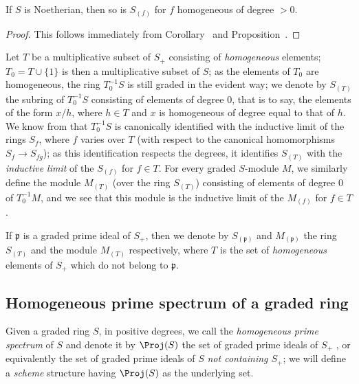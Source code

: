 \begin{corollary}[2.2.6]
\label{II.2.2.6}
If $S$ is Noetherian, then so is $S_{(f)}$ for $f$ homogeneous of degree $>0$.
\end{corollary}

\begin{proof}
This follows immediately from Corollary~ and Proposition~.
\end{proof}

\begin{env}[2.2.7]
\label{II.2.2.7}
Let $T$ be a multiplicative subset of $S_+$ consisting of \emph{homogeneous} elements;
$T_0=T\cup\{1\}$ is then a multiplicative subset of $S$;
as the elements of $T_0$ are homogeneous, the ring $T_0^{-1}S$ is still graded in the evident way;
we denote by $S_{(T)}$ the subring of $T_0^{-1}S$ consisting of elements of degree $0$, that is to say, the elements of the form $x/h$, where $h\in T$ and $x$ is homogeneous of degree equal to that of $h$.
We know from  that $T_0^{-1}S$ is canonically identified with the inductive limit of the rings $S_f$, where $f$ varies over $T$ (with respect to the canonical homomorphisms $S_f\to S_{fg}$);
as this identification respects the degrees, it identifies $S_{(T)}$ with the \emph{inductive limit} of the $S_{(f)}$ for $f\in T$.
For every graded $S$-module $M$, we similarly define the module $M_{(T)}$ (over the ring $S_{(T)}$) consisting of elements of degree $0$ of $T_0^{-1}M$, and we see that this module is the inductive limit of the $M_{(f)}$ for $f\in T$.

If $\mathfrak{p}$ is a graded prime ideal of $S_+$, then we denote by $S_{(\mathfrak{p})}$ and $M_{(\mathfrak{p})}$ the ring $S_{(T)}$ and the module $M_{(T)}$ respectively, where $T$ is the set of \emph{homogeneous} elements of $S_+$ which do not belong to $\mathfrak{p}$.\end{env}


\subsection{Homogeneous prime spectrum of a graded ring}
\label{subsection:II.2.3}

\begin{env}[2.3.1]
\label{II.2.3.1}
Given a graded ring $S$, in positive degrees, we call the \emph{homogeneous prime spectrum} of $S$ and denote it by $\Proj(S)$ the set of graded prime ideals of $S_+$ , or equivalently the set of graded prime ideals of $S$ \emph{not containing $S_+$};
we will define a \emph{scheme} structure having $\Proj(S)$ as the underlying set.
\end{env}

